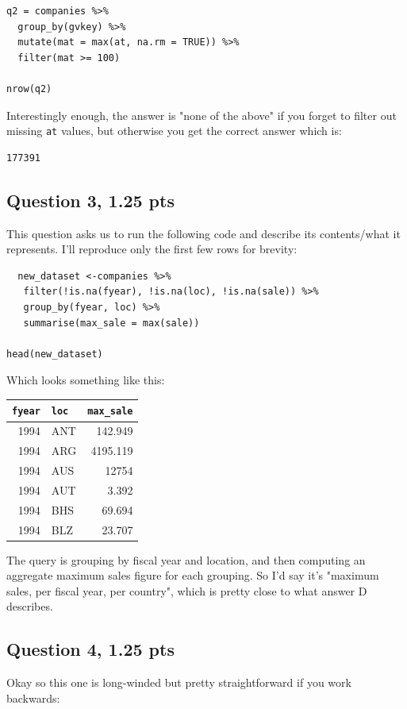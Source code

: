 \documentclass[11pt]{article}
\begin{document}
\begin{verbatim}
q2 = companies %>%
  group_by(gvkey) %>%
  mutate(mat = max(at, na.rm = TRUE)) %>%
  filter(mat >= 100)

nrow(q2)
\end{verbatim}

Interestingly enough, the answer is "none of the above" if you forget to filter out missing \texttt{at} values, but otherwise you get the correct answer which is:

\begin{verbatim}
177391
\end{verbatim}

\subsection*{Question 3, 1.25 pts}
\label{sec:org7800655}
This question asks us to run the following code and describe its contents/what it represents.  I'll reproduce only the first few rows for brevity:

\begin{verbatim}
  new_dataset <-companies %>%
   filter(!is.na(fyear), !is.na(loc), !is.na(sale)) %>%
   group_by(fyear, loc) %>%
   summarise(max_sale = max(sale))

head(new_dataset)
\end{verbatim}

Which looks something like this:

\begin{center}
\begin{tabular}{rlr}
\texttt{fyear} & \texttt{loc} & \texttt{max\_sale}\\[0pt]
\hline
1994 & ANT & 142.949\\[0pt]
1994 & ARG & 4195.119\\[0pt]
1994 & AUS & 12754\\[0pt]
1994 & AUT & 3.392\\[0pt]
1994 & BHS & 69.694\\[0pt]
1994 & BLZ & 23.707\\[0pt]
\end{tabular}
\end{center}

The query is grouping by fiscal year and location, and then computing an aggregate maximum sales figure for each grouping.  So I'd say it's "maximum sales, per fiscal year, per country", which is pretty close to what answer D describes.

\subsection*{Question 4, 1.25 pts}
\label{sec:org6009935}
Okay so this one is long-winded but pretty straightforward if you work backwards:
\end{document}
